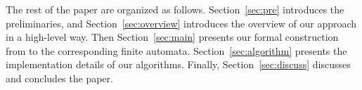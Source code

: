 The rest of the paper are organized as follows. Section~\ref{sec:pre} introduces the preliminaries, and Section~\ref{sec:overview} introduces the overview of our approach in a high-level way. Then Section~\ref{sec:main} presents our formal construction from \ltlf to the corresponding finite automata. Section~\ref{sec:algorithm} presents the implementation details of our algorithms. Finally, Section~\ref{sec:discuss} discusses and concludes the paper.  









